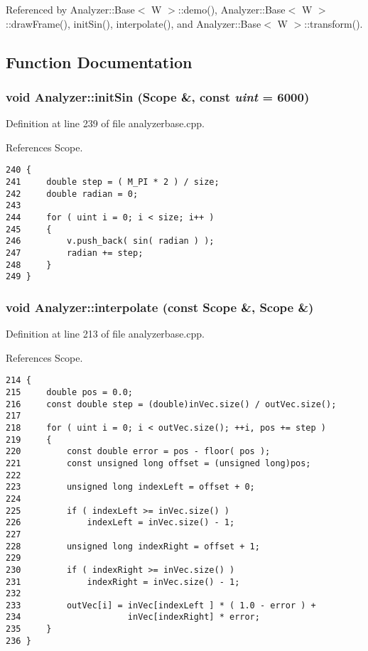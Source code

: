 Referenced by Analyzer::Base$<$ W $>$::demo(), Analyzer::Base$<$ W $>$::draw\-Frame(), init\-Sin(), interpolate(), and Analyzer::Base$<$ W $>$::transform().

\subsection{Function Documentation}
\subsubsection{\setlength{\rightskip}{0pt plus 5cm}void Analyzer::init\-Sin (Scope \&, const {\em uint} = 6000)}\label{namespaceAnalyzer_a2}




Definition at line 239 of file analyzerbase.cpp.

References Scope.



\footnotesize\begin{verbatim}240 {
241     double step = ( M_PI * 2 ) / size;
242     double radian = 0;
243 
244     for ( uint i = 0; i < size; i++ )
245     {
246         v.push_back( sin( radian ) );
247         radian += step;
248     }
249 }
\end{verbatim}\normalsize 
{}
\subsubsection{\setlength{\rightskip}{0pt plus 5cm}void Analyzer::interpolate (const Scope \&, Scope \&)}\label{namespaceAnalyzer_a1}




Definition at line 213 of file analyzerbase.cpp.

References Scope.



\footnotesize\begin{verbatim}214 {
215     double pos = 0.0;
216     const double step = (double)inVec.size() / outVec.size();
217 
218     for ( uint i = 0; i < outVec.size(); ++i, pos += step )
219     {
220         const double error = pos - floor( pos );
221         const unsigned long offset = (unsigned long)pos;
222 
223         unsigned long indexLeft = offset + 0;
224 
225         if ( indexLeft >= inVec.size() )
226             indexLeft = inVec.size() - 1;
227 
228         unsigned long indexRight = offset + 1;
229 
230         if ( indexRight >= inVec.size() )
231             indexRight = inVec.size() - 1;
232 
233         outVec[i] = inVec[indexLeft ] * ( 1.0 - error ) +
234                     inVec[indexRight] * error;
235     }
236 }
\end{verbatim}\normalsize 
